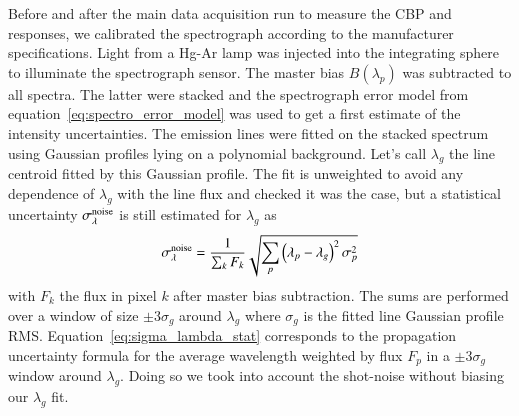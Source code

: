 Before and after the main data acquisition run to measure the CBP and \SD responses, we calibrated the spectrograph according to the manufacturer specifications. Light from a Hg-Ar lamp was injected into the integrating sphere to illuminate the spectrograph sensor. The master bias $B(\lambda_p)$ was subtracted to all spectra. The latter were stacked and the spectrograph error model from equation~\ref{eq:spectro_error_model} was used to get a first estimate of the intensity uncertainties. The emission lines were fitted on the stacked spectrum using Gaussian profiles lying on a polynomial background. Let's call $\lambda_g$ the line centroid fitted by this Gaussian profile. The fit is unweighted to avoid any dependence of $\lambda_g$ with the line flux and checked it was the case, but a statistical uncertainty $\sigma_\lambda^{\rm noise}$ is still estimated for $\lambda_g$ as 
\begin{equation}\label{eq:sigma_lambda_stat}
    \sigma_\lambda^{\rm noise}= \dfrac{1}{\sum_k F_k} \sqrt{\sum_p \left(\lambda_p - \lambda_g\right)^2 \sigma_p^2}
\end{equation}
with $F_k$ the flux in pixel $k$ after master bias subtraction. The sums are performed over a window of size $\pm 3 \sigma_g$ around $\lambda_g$ where $\sigma_g$ is the fitted line Gaussian profile RMS. Equation~\ref{eq:sigma_lambda_stat} corresponds to the propagation uncertainty formula for the average wavelength weighted by flux $F_p$ in a $\pm 3 \sigma_g$  window  around $\lambda_g$. Doing so we took into account the shot-noise without biasing our $\lambda_g$ fit.


